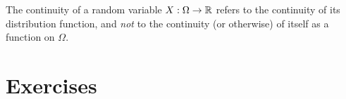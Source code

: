 \begin{remark}
The continuity of a random variable $X:\Omega\to\mathbb{R}$ refers to the continuity of its distribution function, and \emph{not} to the continuity (or otherwise) of itself as a function on $\Omega$.
\end{remark}

\section{Exercises}


\endinput
